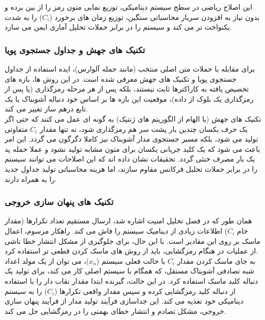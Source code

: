 \documentclass[12pt]{report}
\begin{document}
این اصلاح ریاضی در سطح سیستم دینامیکی، توزیع نمایی متون رمز را از بین برده و بدون نیاز به 
افزودن سربار محاسباتی سنگین، توزیع زمان های برخورد ($C_i$) را به شدت یکنواخت تر می کند و 
سیستم را در برابر حملات تحلیل آماری ایمن می سازد.

\subsubsection[تکنیک های جهش و جداول جستجوی پویا]{تکنیک های جهش و جداول جستجوی پویا}
برای مقابله با حملات متن اصلی منتخب (مانند حمله آلوارس)، ایده استفاده از جداول جستجوی 
 پویا و تکنیک های جهش معرفی شده است. در این روش ها، بازه های 
تخصیص یافته به کاراکترها ثابت نیستند، بلکه پس از هر مرحله رمزگذاری (یا پس از رمزگذاری یک بلوک 
از داده)، موقعیت این بازه ها بر اساس خود دنباله آشوبناک یا یک تابع درهم ساز تغییر می کند. 
\\\noindent
تکنیک های جهش (با الهام از الگوریتم های ژنتیک) به گونه ای عمل می کنند که حتی اگر یک حرف یکسان 
چندین بار پشت سر هم رمزگذاری شود، نه تنها مقدار $C_i$ متفاوتی تولید می شود، بلکه مسیر جستجوی 
مدار آشوبناک نیز کاملا دگرگون می گردد. این امر باعث می شود که یک کلید جریانی 
 یکسان برای متون مشابه تولید نشود و عملا حمله پد یک بار مصرف 
خنثی گردد. تحقیقات نشان داده اند که این اصلاحات می توانند سیستم را در برابر حملات تحلیل 
فرکانس مقاوم سازند، اما هزینه محاسباتی تولید جداول جدید را به همراه دارند.

\subsubsection[تکنیک های پنهان سازی خروجی]{تکنیک های پنهان سازی خروجی}
همان طور که در فصل تحلیل امنیت اشاره شد، ارسال مستقیم تعداد تکرارها (مقدار خام $C_i$) اطلاعات 
زیادی از دینامیک سیستم را فاش می کند. راهکار مرسوم، اعمال ماسک بر روی این مقادیر است. با این 
حال، برای جلوگیری از مشکل انتشار خطا ناشی از عملیات  
در هنگام رمزگشایی، باید از روش های ماسک کردن قطعی تر استفاده کرد. 
\\\noindent
به جای ماسک کردن مقدار $C_i$ با حالت فعلی سیستم ($x_n$)، می توان از یک مولد اعداد شبه تصادفی 
آشوبناک مستقل، که همگام با سیستم اصلی کار می کند، برای تولید یک دنباله 
کلید ماسک استفاده کرد. در این حالت، گیرنده ابتدا مقدار نقاب دار را با استفاده از دنباله کلید 
رمزگشایی کرده و سپس مقدار واقعی تکرارها ($C_i$) را به سیستم دینامیکی خود تغذیه می کند. این 
جداسازی فرآیند تولید مدار از فرآیند پنهان سازی خروجی، مشکل تصادم و انتشار خطای بهمنی را در 
رمزگشایی حل می کند.
\end{document}
